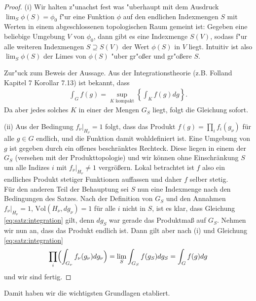 		\begin{proof}
			(i) Wir halten z"unachst fest was "uberhaupt mit dem Ausdruck $\lim_S \phi(S) = \phi_0$ f"ur eine Funktion $\phi$ auf den endlichen Indexmengen $S$ mit Werten in einem abgeschlossenen topologischen Raum gemeint ist: Gegeben eine beliebige Umgebung $V$ von $\phi_0$, dann gibt es eine Indexmenge $S(V)$, sodass f"ur alle weiteren Indexmengen $S \supseteq S(V)$ der Wert $\phi(S)$ in $V$ liegt. Intuitiv ist also  $\lim_S \phi(S)$ der Limes von $\phi(S)$ "uber gr"oßer und gr"oßere $S$.
			
			Zur"uck zum Beweis der Aussage.
			Aus der Integrationstheorie (z.B. Folland \cite{folland} Kapitel 7 Korollar 7.13) ist bekannt, dass %
			\begin{align*}
				\int_{G} f(g) = \sup_{K \text{ kompakt}} \left\{ \int_{K} f(g)dg \right\}.
			\end{align*}
			Da aber jedes solches $K$ in einer der Mengen $G_S$ liegt, folgt die Gleichung sofort.
			
			\noindent(ii) Aus der Bedingung $f_\nu |_{H_\nu} = 1$ folgt, dass das Produkt $f(g) = \prod_{i}f_{i}(g_\nu)$ für alle $g \in G$ endlich, und die Funktion damit wohldefiniert ist. Eine Umgebung von $g$ ist gegeben durch ein offenes beschränktes Rechteck. Diese liegen in einem der $G_S$ (versehen mit der Produkttopologie) und wir können ohne Einschränkung $S$ um alle Indizes $i$ mit $f_\nu|_{H_\nu}\not= 1$ vergrößern.
			Lokal betrachtet ist $f$ also ein endliches Produkt stetiger Funktionen auffassen und daher $f$ selber stetig.\\
			Für den anderen Teil der Behauptung sei $S$ nun eine Indexmenge nach den Bedingungen des Satzes. 
			Nach der Definition von $G_S$ und den Annahmen $f_\nu|_{H_\nu} = 1$, $\text{Vol}(H_\nu, dg_\nu) = 1$ für alle $i$ nicht in $S$, ist es klar, dass Gleichung \ref{eq:satz:integration} gilt, denn $dg_S$ war gerade das Produktmaß auf $G_S$. Nehmen wir nun an, dass das Produkt endlich ist. 
			Dann gilt aber nach (i) und Gleichung \ref{eq:satz:integration}
			\begin{align*}
				\prod_{i}\Bigl(\int_{G_\nu} f_\nu (g_\nu)dg_\nu\Bigr) = \lim_S \int_{G_S} f(g_S) dg_S = \int_{G} f(g) dg
			\end{align*}
			und wir sind fertig.
		\end{proof}
	Damit haben wir die wichtigsten Grundlagen etabliert.